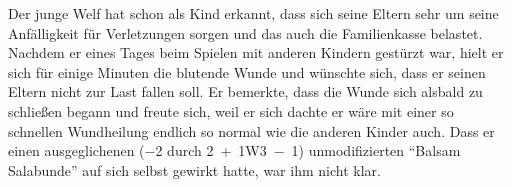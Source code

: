Der junge Welf hat schon als Kind erkannt, dass sich seine Eltern sehr um seine Anfälligkeit für Verletzungen sorgen und das auch die Familienkasse belastet. Nachdem er eines Tages beim Spielen mit anderen Kindern gestürzt war, hielt er sich für einige Minuten die blutende Wunde und wünschte sich, dass er seinen Eltern nicht zur Last fallen soll. Er bemerkte, dass die Wunde sich alsbald zu schließen begann und freute sich, weil er sich dachte er wäre mit einer so schnellen Wundheilung endlich so normal wie die anderen Kinder auch. Dass er einen ausgeglichenen (\SI{-2}{\ZfPstern} durch 2~+~1W3~−~\SI{1}{\AsP}) unmodifizierten \enquote{Balsam Salabunde} auf sich selbst gewirkt hatte, war ihm nicht klar.
